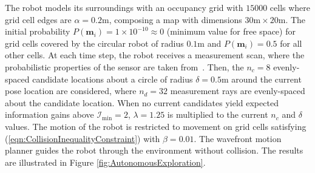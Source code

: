 \documentclass[letterpaper, 10pt]{ieeeconf}
\newcommand{\refeqn}[1]{(\ref{eqn:#1})}
\begin{document}
The robot models its surroundings with an occupancy grid with $15000$ cells where grid cell edges are $\alpha=0.2$m, composing a map with dimensions $30\text{m}\times20\text{m}$. The initial probability $P(\mathbf{m}_i)=1\times10^{-10}\approx0$ (minimum value for free space) for grid cells covered by the circular robot of radius $0.1$m and $P(\mathbf{m}_i)=0.5$ for all other cells.
At each time step, the robot receives a measurement scan, where the probabilistic properties of the sensor are taken from~\cite{PirRutBisSch11,KhoElb12}. Then, the $n_c=8$ evenly-spaced candidate locations about a circle of radius $\delta=0.5$m around the current pose location are considered, where $n_d=32$ measurement rays are evenly-spaced about the candidate location.  When no current candidates yield expected information gains above $\mathcal I_\text{min}=2$, $\lambda=1.25$ is multiplied to the current $n_c$ and $\delta$ values. The motion of the robot is restricted to movement on grid cells satisfying \refeqn{CollisionInequalityConstraint} with $\beta=0.01$. The wavefront motion planner guides the robot through the environment without collision. The results are illustrated in Figure \ref{fig:AutonomousExploration}.
\end{document}
